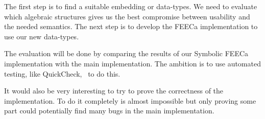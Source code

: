 \documentclass{scrartcl}
\begin{document}



The first step is to find a suitable embedding or data-types. We need to evaluate
which algebraic structures gives us the best compromise between usability and
the needed semantics. The next step is to develop the FEECa implementation to
use our new data-types.

The evaluation will be done by comparing the results of our Symbolic FEECa
implementation with the main implementation.
The ambition is to use automated
testing, like QuickCheck,~\cite{claessen_quickcheck_2000} to do this.

It would also be very interesting to try to prove the correctness of the
implementation. To do it completely is almost impossible but only proving some
part could potentially find many bugs in the main implementation.











\end{document}
